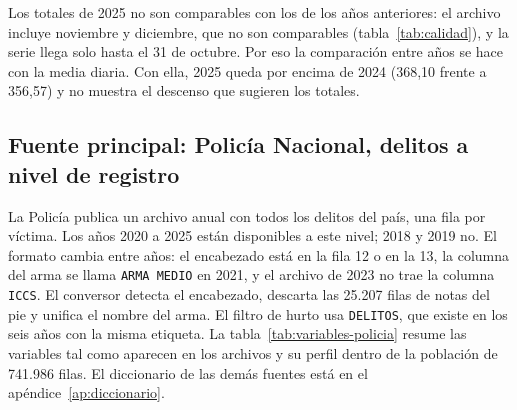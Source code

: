 Los totales de 2025 no son comparables con los de los años anteriores: el archivo incluye noviembre y diciembre, que no son comparables (tabla~\ref{tab:calidad}), y la serie llega solo hasta el 31 de octubre. Por eso la comparación entre años se hace con la media diaria. Con ella, 2025 queda por encima de 2024 (368,10 frente a 356,57) y no muestra el descenso que sugieren los totales.

\subsection{Fuente principal: Policía Nacional, delitos a nivel de registro}

La Policía publica un archivo anual con todos los delitos del país, una fila por víctima. Los años 2020 a 2025 están disponibles a este nivel; 2018 y 2019 no. El formato cambia entre años: el encabezado está en la fila 12 o en la 13, la columna del arma se llama \texttt{ARMA MEDIO} en 2021, y el archivo de 2023 no trae la columna \texttt{ICCS}. El conversor detecta el encabezado, descarta las 25.207 filas de notas del pie y unifica el nombre del arma. El filtro de hurto usa \texttt{DELITOS}, que existe en los seis años con la misma etiqueta. La tabla~\ref{tab:variables-policia} resume las variables tal como aparecen en los archivos y su perfil dentro de la población de 741.986 filas. El diccionario de las demás fuentes está en el apéndice~\ref{ap:diccionario}.

